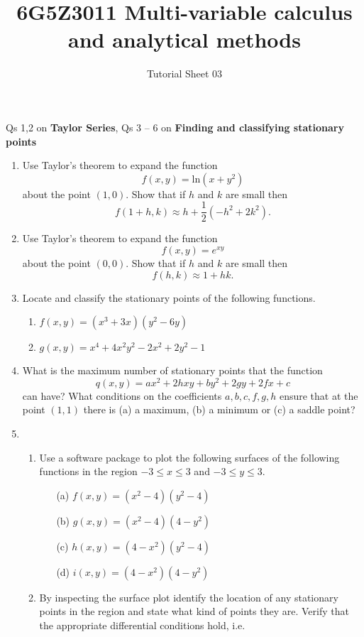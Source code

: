 \documentclass[a4paper]{amsart}
\begin{document}
\title{6G5Z3011 Multi-variable calculus and analytical methods}
\author{Tutorial Sheet 03}
\maketitle

Qs 1,2 on \textbf{Taylor Series}, Qs 3 -- 6 on \textbf{Finding and classifying stationary points}
\begin{enumerate}
    \item
    Use Taylor's theorem to expand the function 
    $$f(x,y) = \text{ln}(x+y^2)$$
    about the point $(1,0)$. Show that if $h$ and $k$ are small then
    $$f(1+h,k) \approx h + \frac{1}{2} (-h^2 + 2k^2).$$
    \item
    Use Taylor's theorem to expand the function 
    $$f(x,y) = e^{xy}$$
    about the point $(0,0)$. Show that if $h$ and $k$ are small then
    $$f(h,k) \approx 1+hk.$$
    \item
    Locate and classify the stationary points of the following functions.
    \begin{enumerate}
    \item
    $f(x,y)=(x^3+3x)(y^2-6y)$
    \item
    $g(x,y)=x^4 + 4 x^2 y^2 - 2 x^2 + 2 y^2 - 1$
    \end{enumerate}
    \item
    What is the maximum number of stationary points that the function
    $$q(x,y) = ax^2 + 2hxy + by^2 + 2gy +2fx + c $$
    can have? What conditions on the coefficients $a,b,c,f,g,h$ ensure that at the point $(1,1)$ there is (a) a maximum, (b) a minimum or (c) a saddle point?
    \item
    \begin{enumerate}
    \item
    Use a software package to plot the following surfaces of the following functions in the region $-3 \leq x \leq 3$ and $-3 \leq y \leq 3$.
    \begin{enumerate}
    \item[(a)]
    $f(x,y)=(x^2 - 4)(y^2 - 4)$
    \item[(b)]
    $g(x,y) = (x^2 - 4)(4 - y^2)$
    \item[(c)]
    $h(x,y)=(4-x^2)(y^2-4)$
    \item[(d)]
    $i(x,y) = (4-x^2)(4-y^2)$
    \end{enumerate}
    \item
    By inspecting the surface plot identify the location of any stationary points in the region and state what kind of points they are. Verify that the appropriate differential conditions hold, i.e.

\end{enumerate}
\end{enumerate}
\end{document}
